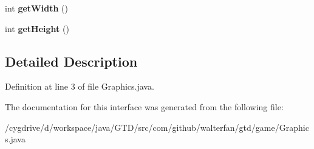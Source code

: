 \begin{DoxyCompactItemize}
\item 
\hypertarget{interfacecom_1_1github_1_1walterfan_1_1gtd_1_1game_1_1Graphics_a7b012a6820c5f51c99d1c88cf21ae6b5}{int {\bfseries get\-Width} ()}\label{interfacecom_1_1github_1_1walterfan_1_1gtd_1_1game_1_1Graphics_a7b012a6820c5f51c99d1c88cf21ae6b5}

\item 
\hypertarget{interfacecom_1_1github_1_1walterfan_1_1gtd_1_1game_1_1Graphics_acd5fbb76b734486c999bf0978623827b}{int {\bfseries get\-Height} ()}\label{interfacecom_1_1github_1_1walterfan_1_1gtd_1_1game_1_1Graphics_acd5fbb76b734486c999bf0978623827b}

\end{DoxyCompactItemize}


\subsection{Detailed Description}


Definition at line 3 of file Graphics.\-java.



The documentation for this interface was generated from the following file\-:\begin{DoxyCompactItemize}
\item 
/cygdrive/d/workspace/java/\-G\-T\-D/src/com/github/walterfan/gtd/game/Graphics.\-java\end{DoxyCompactItemize}
